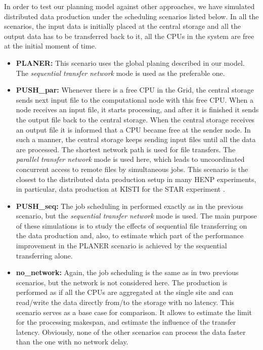 \documentclass{svjour3}                     %
\begin{document}
In order to test our planning model against other approaches, we have simulated distributed data production under the scheduling scenarios listed below. In all the scenarios, the input data is initially placed at the central storage and all the output data has to be transferred back to it, all the CPUs in the system are free at the initial moment of time.
\begin{itemize}
\item \textbf{PLANER:}  This scenario uses the global planing described in our model. The \textit{sequential transfer network} mode is used as the preferable one. 
\item \textbf{PUSH\_par:} Whenever there is a free CPU in the Grid, the central storage sends next input file to the computational node with this free CPU. When a node receives an input file, it starts processing, and after it is finished it sends the output file back to the central storage. When the central storage receives an output file it is informed that a CPU became free at the sender node. In such a manner, the central storage keeps sending input files until all the data are processed. The shortest network path is used for file transfers. The \textit{parallel transfer network} mode is used here, which leads to uncoordinated concurrent access to remote files by simultaneous jobs. This scenario is the closest to the distributed data production setup in many HENP experiments, in particular, data production at KISTI for the STAR experiment \cite{KISTI-production}. 
\item \textbf{PUSH\_seq:} The job scheduling in performed exactly as in the previous scenario, but the \textit{sequential transfer network} mode is used. The main purpose of these simulations is to study the effects of sequential file transferring on the data production and, also, to estimate which part of the performance improvement in the PLANER scenario is achieved by the sequential transferring alone.
\item \textbf{no\_network:} Again, the job scheduling is the same as in two previous scenarios, but the network is not considered here. The production is performed as if all the CPUs are aggregated at the single site and can read/write the data directly from/to the storage with no latency. This scenario serves as a base case for comparison. It allows to estimate the limit for the processing makespan, and estimate the influence of the transfer latency. Obviously, none of the other scenarios can process the data faster than the one with no network delay.
\end{itemize}
\end{document}
